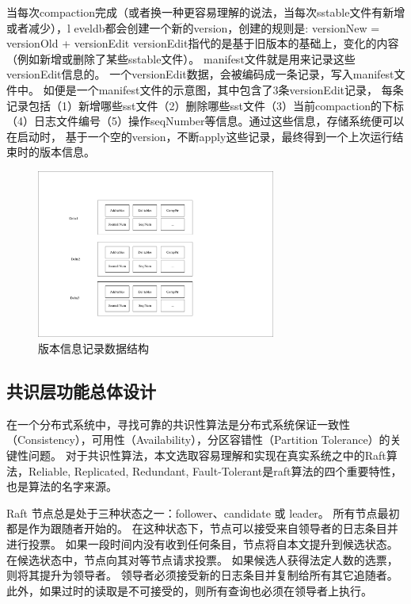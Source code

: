 		当每次compaction完成（或者换一种更容易理解的说法，当每次sstable文件有新增或者减少），l
		eveldb都会创建一个新的version，创建的规则是: versionNew = versionOld + versionEdit
		versionEdit指代的是基于旧版本的基础上，变化的内容（例如新增或删除了某些sstable文件）。
		manifest文件就是用来记录这些versionEdit信息的。
		一个versionEdit数据，会被编码成一条记录，写入manifest文件中。
		如便是一个manifest文件的示意图，其中包含了3条versionEdit记录，
		每条记录包括（1）新增哪些sst文件（2）删除哪些sst文件（3）当前compaction的下标
		（4）日志文件编号（5）操作seqNumber等信息。通过这些信息，存储系统便可以在启动时，
		基于一个空的version，不断apply这些记录，最终得到一个上次运行结束时的版本信息。

		\begin{figure}[H]
			\centering
			\includegraphics[width=0.70\textwidth]{pdf/manifest.pdf}
			\caption{版本信息记录数据结构}
			\label{radds_storage_manifest}
		\end{figure}
		\subsection{共识层功能总体设计}	
		在一个分布式系统中，寻找可靠的共识性算法是分布式系统保证一致性（Consistency），可用性（Availability），分区容错性（Partition Tolerance）的关键性问题。
		对于共识性算法，本文选取容易理解和实现在真实系统之中的Raft算法，Reliable, Replicated, Redundant, Fault-Tolerant是raft算法的四个重要特性，也是算法的名字来源。
		
		Raft 节点总是处于三种状态之一：follower、candidate 或 leader。 
		所有节点最初都是作为跟随者开始的。 在这种状态下，节点可以接受来自领导者的日志条目并进行投票。 
		如果一段时间内没有收到任何条目，节点将自本文提升到候选状态。 在候选状态中，节点向其对等节点请求投票。 
		如果候选人获得法定人数的选票，则将其提升为领导者。 领导者必须接受新的日志条目并复制给所有其它追随者。 
		此外，如果过时的读取是不可接受的，则所有查询也必须在领导者上执行。
	
